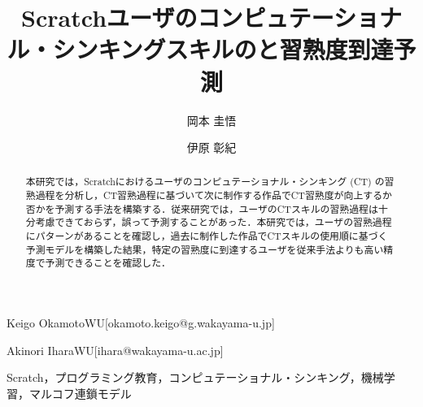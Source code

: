 \documentclass[submit]{ipsj}
\begin{document}
\title{Scratchユーザのコンピュテーショナル・シンキングスキルの\textcolor{red}{}と習熟度到達予測}






\author{岡本 圭悟}{Keigo Okamoto}{WU}[okamoto.keigo@g.wakayama-u.jp]
\author{伊原 彰紀}{Akinori Ihara}{WU}[ihara@wakayama-u.ac.jp]


\begin{abstract}
本研究では，Scratchにおけるユーザのコンピュテーショナル・シンキング (CT) の習熟過程\textcolor{red}{}を分析し，CT習熟過程に基づいて次に制作する作品でCT習熟度が向上するか否かを予測する手法を構築する．従来研究では，ユーザのCTスキルの習熟過程は十分考慮できておらず，誤って予測することがあった．本研究では，ユーザの習熟過程にパターンがあることを確認し，過去に制作した作品でCTスキルの使用順に基づく予測モデルを構築した結果，特定の習熟度に到達するユーザを従来手法よりも高い精度で予測できることを確認した．
\end{abstract}

\begin{jkeyword}
Scratch，プログラミング教育，コンピュテーショナル・シンキング，機械学習，マルコフ連鎖モデル
\end{jkeyword}
\end{document}
